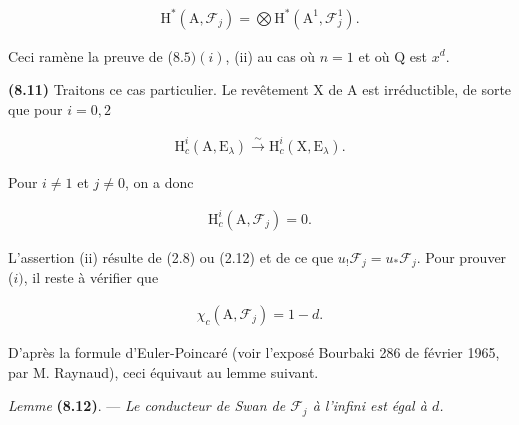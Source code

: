 \documentclass[10pt,leqno]{article}
\begin{document}
\begin{equation*}\begin{gathered}\mathrm{H}^{*}(\mathrm{A},\mathcal{F} _{j}) = \bigotimes \mathrm{H}^{*}(\mathrm{A}^{1},\mathcal{F} _{j}^{1}).\end{gathered}\end{equation*}

\noindent Ceci ramène la preuve de (\(8.5) (i)\), (ii) au cas où \(n = 1\) et où \(\mathrm{Q}\) est \(x^{d}\).\par

\noindent \textbf{(8.11)} Traitons ce cas particulier. Le revêtement \(\mathrm{X}\) de \(\mathrm{A}\) est irréductible, de sorte que pour \(i = 0,2\)\par

\begin{equation*}\begin{gathered}\mathrm{H}_{c}^{i}(\mathrm{A},\mathrm{E}_{\lambda }) \xrightarrow{\sim } \mathrm{H}_{c}^{i}(\mathrm{X},\mathrm{E}_{\lambda }).\end{gathered}\end{equation*}

\noindent Pour \(i \ne  1\) et \(j \ne  0\), on a donc\par

\begin{equation*}\begin{gathered}\mathrm{H}_{c}^{i}(\mathrm{A},\mathcal{F} _{j}) = 0.\end{gathered}\end{equation*}

\noindent L'assertion (ii) résulte de (2.8) ou (2.12) et de ce que \(u_{!}\mathcal{F} _{j} = u_{*}\mathcal{F} _{j}\). Pour prouver (\(i)\), il reste à vérifier que\par

\begin{equation*}\begin{gathered}\chi _{c}(\mathrm{A},\mathcal{F} _{j}) = 1-d.\end{gathered}\end{equation*}

\noindent D'après la formule d'Euler-Poincaré (voir l'exposé Bourbaki 286 de février 1965, par \(\mathrm{M}\). Raynaud), ceci équivaut au lemme suivant.\par

\noindent \emph{Lemme} \textbf{(8.12)}. — {\itshape Le conducteur de Swan de \(\mathcal{F} _{j}\) à l'infini est égal à \(d\).}\par
\end{document}

